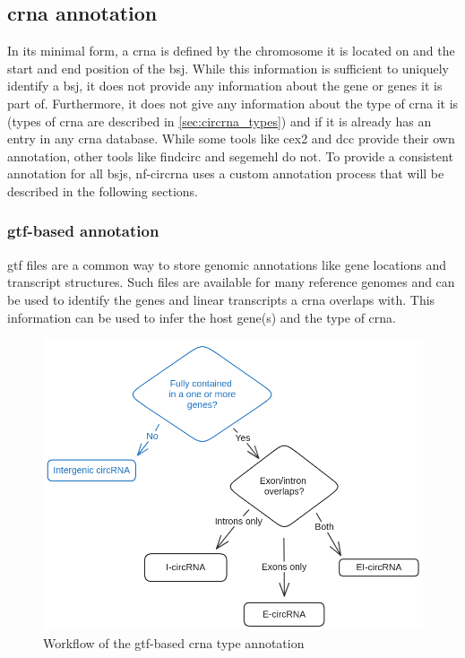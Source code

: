 \subsection{\gls{crna} annotation}
In its minimal form, a \gls{crna} is defined by the chromosome it is located on
and the start and end position of the \gls{bsj}.
While this information is sufficient to uniquely identify a \gls{bsj}, it does
not provide any information about the gene or genes it is part of.
Furthermore, it does not give any information about the type of \gls{crna} it
is (types of \gls{crna} are described in \cref{sec:circrna_types}) and if it is
already has an entry in any \gls{crna} database.
While some tools like \gls{cex2} and \gls{dcc} provide their own annotation,
other tools like \gls{findcirc} and \gls{segemehl} do not.
To provide a consistent annotation for all \glspl{bsj}, \gls{nf-circrna} uses a
custom annotation process that will be described in the following sections.

\subsubsection{\gls{gtf}-based annotation}
\label{sec:gtf_annotation}
\gls{gtf} files are a common way to store genomic annotations like gene
locations and
transcript structures.
Such files are available for many reference genomes and can be used to identify
the genes and linear transcripts a \gls{crna} overlaps with.
This information can be used to infer the host gene(s) and the type of
\gls{crna}.

\begin{figure}[ht]
      \centering

      \includegraphics[width=\textwidth]{chapters/3_materials_and_methods/figures/annotation.png}
      \caption{Workflow of the \gls{gtf}-based \gls{crna} type annotation}
      \label{fig:gtf_annotation}
\end{figure}


